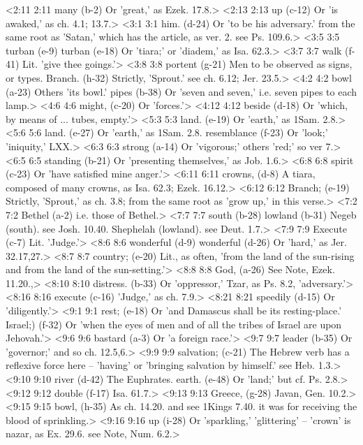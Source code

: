 <2:11 2:11  many (b-2)  Or 'great,' as Ezek. 17.8.>
<2:13 2:13  up (c-12)  Or 'is awaked,' as ch. 4.1; 13.7.>
<3:1 3:1  him. (d-24)  Or 'to be his adversary.' from the same root as 'Satan,'  which has the article, as ver. 2. see Ps. 109.6.>
<3:5 3:5  turban (e-9)  turban (e-18)
  Or 'tiara;' or 'diadem,' as Isa. 62.3.>
<3:7 3:7  walk (f-41)  Lit. 'give thee goings.'>
<3:8 3:8  portent (g-21)  Men to be observed as signs, or types.
  Branch. (h-32)  Strictly, 'Sprout.' see ch. 6.12; Jer. 23.5.>
<4:2 4:2  bowl (a-23)  Others 'its bowl.'
  pipes (b-38)  Or 'seven and seven,' i.e. seven pipes to each lamp.>
<4:6 4:6  might, (c-20)  Or 'forces.'>
<4:12 4:12  beside (d-18)  Or 'which, by means of ... tubes, empty.'>
<5:3 5:3  land. (e-19)  Or 'earth,' as 1Sam. 2.8.>
<5:6 5:6  land. (e-27)  Or 'earth,' as 1Sam. 2.8.
  resemblance (f-23)  Or 'look;' 'iniquity,' LXX.>
<6:3 6:3  strong (a-14)  Or 'vigorous;' others 'red;' so ver 7.>
<6:5 6:5  standing (b-21)  Or 'presenting themselves,' as Job. 1.6.>
<6:8 6:8  spirit (c-23)  Or 'have satisfied mine anger.'>
<6:11 6:11  crowns, (d-8)  A tiara, composed of many crowns, as Isa. 62.3; Ezek. 16.12.>
<6:12 6:12  Branch; (e-19)  Strictly, 'Sprout,' as ch. 3.8; from the same root as 'grow  up,' in this verse.>
<7:2 7:2  Bethel (a-2)  i.e. those of Bethel.>
<7:7 7:7  south (b-28)  lowland (b-31)
  Negeb (south). see Josh. 10.40. Shephelah (lowland). see  Deut. 1.7.>
<7:9 7:9  Execute (c-7)  Lit. 'Judge.'>
<8:6 8:6  wonderful (d-9)  wonderful (d-26)
  Or 'hard,' as Jer. 32.17,27.>
<8:7 8:7  country; (e-20)  Lit., as often, 'from the land of the sun-rising and from the  land of the sun-setting.'>
<8:8 8:8  God, (a-26)  See Note, Ezek. 11.20.,>
<8:10 8:10  distress. (b-33)  Or 'oppressor,' Tzar, as Ps. 8.2, 'adversary.'>
<8:16 8:16  execute (c-16)  'Judge,' as ch. 7.9.>
<8:21 8:21  speedily (d-15)  Or 'diligently.'>
<9:1 9:1  rest; (e-18)  Or 'and Damascus shall be its resting-place.'
  Israel;) (f-32)  Or 'when the eyes of men and of all the tribes of Israel are  upon Jehovah.'>
<9:6 9:6  bastard (a-3)  Or 'a foreign race.'>
<9:7 9:7  leader (b-35)  Or 'governor;' and so ch. 12.5,6.>
<9:9 9:9  salvation; (c-21)  The Hebrew verb has a reflexive force here -- 'having' or  'bringing salvation by himself.' see Heb. 1.3.>
<9:10 9:10  river (d-42)  The Euphrates.
  earth. (e-48)  Or 'land;' but cf. Ps. 2.8.>
<9:12 9:12  double (f-17)  Isa. 61.7.>
<9:13 9:13  Greece, (g-28)  Javan, Gen. 10.2.>
<9:15 9:15  bowl, (h-35)  As ch. 14.20. and see 1Kings 7.40. it was for receiving the  blood of sprinkling.>
<9:16 9:16  up (i-28)  Or 'sparkling,' 'glittering' -- 'crown' is nazar, as Ex. 29.6. see Note, Num. 6.2.>
